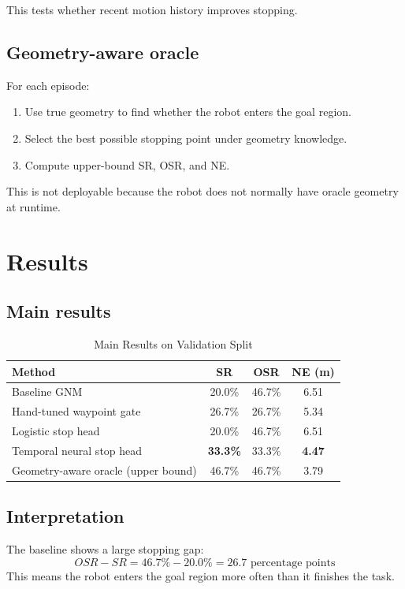\documentclass[conference]{IEEEtran}
\begin{document}
This tests whether recent motion history improves stopping.

\subsection{Geometry-aware oracle}
For each episode:
\begin{enumerate}
    \item Use true geometry to find whether the robot enters the goal region.
    \item Select the best possible stopping point under geometry knowledge.
    \item Compute upper-bound SR, OSR, and NE.
\end{enumerate}

This is not deployable because the robot does not normally have oracle geometry at runtime.

\section{Results}

\subsection{Main results}

\begin{table}[h]
\centering
\caption{Main Results on Validation Split}
\begin{tabular}{lccc}
\toprule
\textbf{Method} & \textbf{SR} & \textbf{OSR} & \textbf{NE (m)} \\
\midrule
Baseline GNM & 20.0\% & 46.7\% & 6.51 \\
Hand-tuned waypoint gate & 26.7\% & 26.7\% & 5.34 \\
Logistic stop head & 20.0\% & 46.7\% & 6.51 \\
Temporal neural stop head & \textbf{33.3\%} & 33.3\% & \textbf{4.47} \\
Geometry-aware oracle (upper bound) & 46.7\% & 46.7\% & 3.79 \\
\bottomrule
\end{tabular}
\end{table}

\subsection{Interpretation}
The baseline shows a large stopping gap:
\[
OSR - SR = 46.7\% - 20.0\% = 26.7 \text{ percentage points}
\]
This means the robot enters the goal region more often than it finishes the task.
\end{document}

